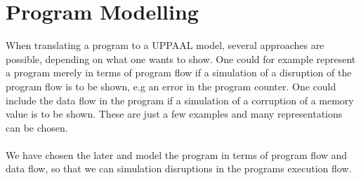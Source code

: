 \section{Program Modelling}
When translating a program to a UPPAAL model, several approaches are possible, depending on what one wants to show. One could for example represent a program merely in terms of program flow if a simulation of a disruption of the program flow is to be shown, e.g an error in the program counter. One could include the data flow in the program if a simulation of a corruption of a memory value is to be shown. These are just a few examples and many representations can be chosen.\\\\
%
We have chosen the later and model the program in terms of program flow and data flow, so that we can simulation disruptions in the programs execution flow.\\\\
%





